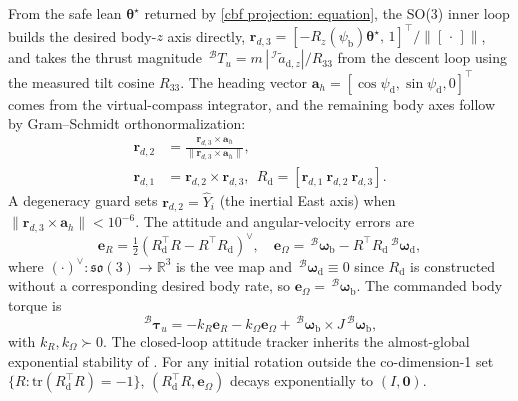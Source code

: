 \documentclass{IEEEtaes}
\begin{document}
From the safe lean $\boldsymbol{\theta}^\star$ returned by \eqref{cbf projection: equation}, the SO(3) inner loop builds the desired body-$z$ axis directly, $\boldsymbol{r}_{d,3}=[-R_z(\psi_\text{b})\boldsymbol{\theta}^\star,\,1]^\top/\|[\,\cdot\,]\|$, and takes the thrust magnitude $\,^\mathcal{B}T_u=m\,|\,^\mathcal{I}\tilde{a}_{\text{d},z}|/R_{33}$ from the descent loop using the measured tilt cosine $R_{33}$. The heading vector $\boldsymbol{a}_h=[\cos\psi_\text{d},\sin\psi_\text{d},0]^\top$ comes from the virtual-compass integrator, and the remaining body axes follow by Gram--Schmidt orthonormalization:
\begin{align} \label{R_d construction: equation}
    \boldsymbol{r}_{d,2} &= \frac{\boldsymbol{r}_{d,3}\times\boldsymbol{a}_h}{\|\boldsymbol{r}_{d,3}\times\boldsymbol{a}_h\|}, \nonumber\\
    \boldsymbol{r}_{d,1} &= \boldsymbol{r}_{d,2}\times\boldsymbol{r}_{d,3},\ \ R_\text{d}=[\boldsymbol{r}_{d,1}\ \boldsymbol{r}_{d,2}\ \boldsymbol{r}_{d,3}].
\end{align}
A degeneracy guard sets $\boldsymbol{r}_{d,2}=\hat{Y}_i$ (the inertial East axis) when $\|\boldsymbol{r}_{d,3}\times\boldsymbol{a}_h\|<10^{-6}$. The attitude and angular-velocity errors are
\begin{equation} \label{so3 errors: equation}
    \boldsymbol{e}_R = \tfrac12(R_\text{d}^\top R - R^\top R_\text{d})^\vee,\quad \boldsymbol{e}_\Omega = \,^\mathcal{B} \boldsymbol{\omega}_{\text{b}} - R^\top R_\text{d}\,^\mathcal{B}\boldsymbol{\omega}_\text{d},
\end{equation}
where $(\cdot)^\vee:\mathfrak{so}(3)\to\mathbb{R}^3$ is the vee map and $\,^\mathcal{B}\boldsymbol{\omega}_\text{d}\equiv 0$ since $R_\text{d}$ is constructed without a corresponding desired body rate, so $\boldsymbol{e}_\Omega=\,^\mathcal{B} \boldsymbol{\omega}_{\text{b}}$. The commanded body torque is
\begin{equation} \label{so3 torque: equation}
    \,^\mathcal{B}\boldsymbol{\tau}_u = -k_R\boldsymbol{e}_R - k_\Omega\boldsymbol{e}_\Omega + \,^\mathcal{B} \boldsymbol{\omega}_{\text{b}}\times J\,^\mathcal{B} \boldsymbol{\omega}_{\text{b}},
\end{equation}
with $k_R,k_\Omega\succ 0$. The closed-loop attitude tracker inherits the almost-global exponential stability of \cite[Thm.~3.1]{lee2010}. For any initial rotation outside the co-dimension-1 set $\{R:\text{tr}(R_\text{d}^\top R)=-1\}$, $(R_\text{d}^\top R,\boldsymbol{e}_\Omega)$ decays exponentially to $(I,\boldsymbol{0})$.
\end{document}

